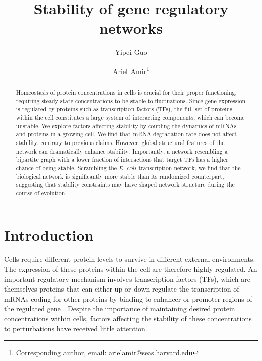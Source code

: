 \documentclass[10pt]{article}
\title{Stability of gene regulatory networks}
\author[1,2]{Yipei Guo}
\author[1]{Ariel Amir\thanks{Corresponding author, email: arielamir@seas.harvard.edu}}
\affil[1]{John A. Paulson School of Engineering and Applied Sciences, Harvard University, Cambridge, MA 02138}
\affil[2]{Program in Biophysics, Harvard University, Boston, MA 02115}
\date{}
\begin{document}
\maketitle
\begin{abstract}
    Homeostasis of protein concentrations in cells is crucial for their proper functioning, requiring steady-state concentrations to be stable to fluctuations.  Since gene expression is regulated by proteins such as transcription factors (TFs), the full set of proteins within the cell constitutes a large system of interacting components, which can become unstable. We explore factors affecting stability by coupling the dynamics of mRNAs and proteins in a growing cell. We find that mRNA degradation rate does not affect stability, contrary to previous claims. However, global structural features of the network can dramatically enhance
stability. Importantly, a network resembling a bipartite graph with a lower fraction of interactions that target TFs has a higher chance of being stable. Scrambling the $\textit{E. coli}$ transcription network, we find that the biological network is significantly more stable than its randomized counterpart, suggesting that stability constraints may have
shaped network structure during the course of evolution.          
\end{abstract}


\section*{Introduction}
Cells require different protein levels to survive in different external environments. The expression of these proteins within the cell are therefore highly regulated. An important regulatory mechanism involves transcription factors (TFs), which are themselves proteins that can either up or down regulate the transcription of mRNAs coding for other proteins by binding to enhancer or promoter regions of the regulated gene \cite{alon2019introduction}. Despite the importance of maintaining desired protein concentrations within cells, factors affecting the stability of these concentrations to perturbations have received little attention.
\end{document}

